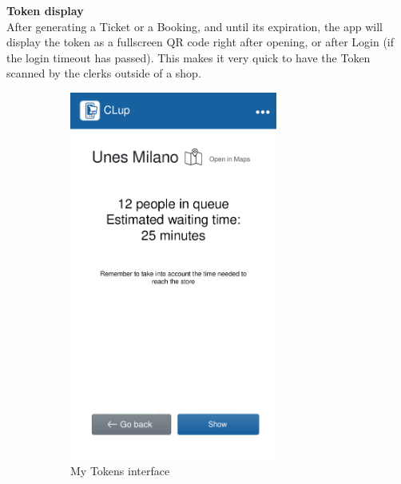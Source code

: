 \pagebreak
\textbf{Token display}\\
\label{page:token_show}
After generating a Ticket or a Booking, and until its expiration, the app will display the token as a fullscreen QR code right after opening, or after Login (if the login timeout has passed).
This makes it very quick to have the Token scanned by the clerks outside of a shop.
\begin{figure}[H]
    \begin{subfigure}{0.5\textwidth}
        \centering
        \includegraphics[width=0.75\textwidth]{Images/queue-mockup.png}
        \caption{My Tokens interface}
    \end{subfigure}%
    \begin{subfigure}{0.5\textwidth}
        \centering

\end{subfigure}
\end{figure}
